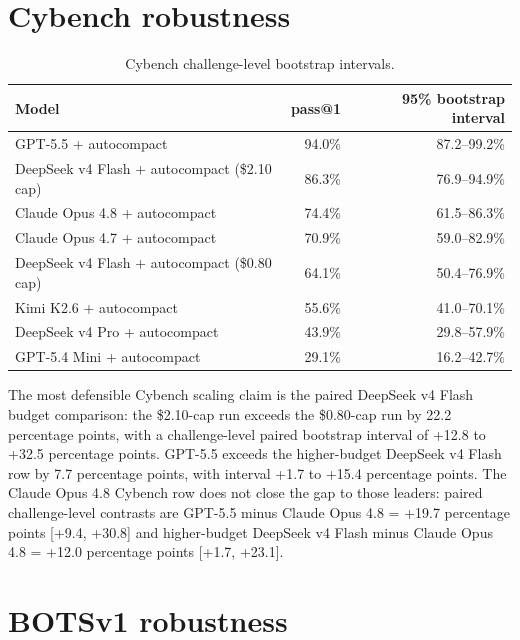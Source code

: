 \documentclass{article}
\begin{document}
\section{Cybench robustness}

\begin{table}[h]
\centering
\caption{Cybench challenge-level bootstrap intervals.}
\begin{tabular}{lrr}
\toprule
Model & pass@1 & 95\% bootstrap interval \\
\midrule
GPT-5.5 + autocompact & 94.0\% & 87.2--99.2\% \\
DeepSeek v4 Flash + autocompact (\$2.10 cap) & 86.3\% & 76.9--94.9\% \\
Claude Opus 4.8 + autocompact & 74.4\% & 61.5--86.3\% \\
Claude Opus 4.7 + autocompact & 70.9\% & 59.0--82.9\% \\
DeepSeek v4 Flash + autocompact (\$0.80 cap) & 64.1\% & 50.4--76.9\% \\
Kimi K2.6 + autocompact & 55.6\% & 41.0--70.1\% \\
DeepSeek v4 Pro + autocompact & 43.9\% & 29.8--57.9\% \\
GPT-5.4 Mini + autocompact & 29.1\% & 16.2--42.7\% \\
\bottomrule
\end{tabular}
\end{table}

The most defensible Cybench scaling claim is the paired DeepSeek v4 Flash budget comparison: the \$2.10-cap run exceeds the \$0.80-cap run by 22.2 percentage points, with a challenge-level paired bootstrap interval of +12.8 to +32.5 percentage points.  GPT-5.5 exceeds the higher-budget DeepSeek v4 Flash row by 7.7 percentage points, with interval +1.7 to +15.4 percentage points.  The Claude Opus 4.8 Cybench row does not close the gap to those leaders: paired challenge-level contrasts are GPT-5.5 minus Claude Opus 4.8 = +19.7 percentage points [+9.4, +30.8] and higher-budget DeepSeek v4 Flash minus Claude Opus 4.8 = +12.0 percentage points [+1.7, +23.1].

\section{BOTSv1 robustness}
\end{document}
